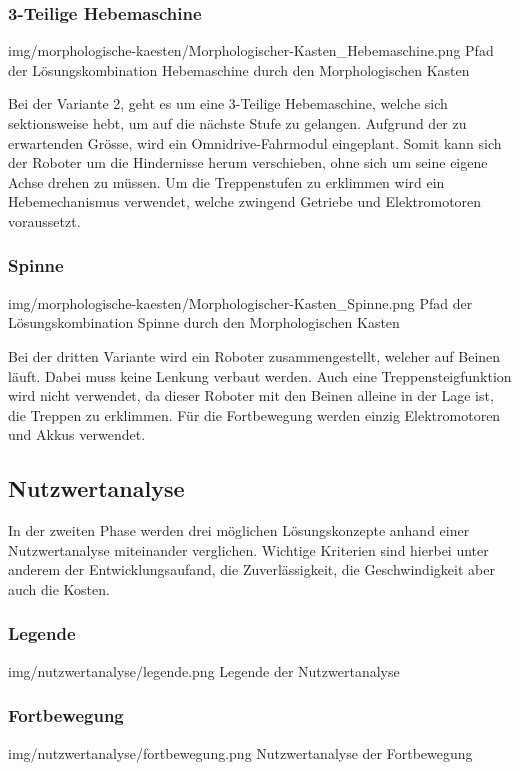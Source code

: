 \subsubsection{3-Teilige Hebemaschine}
\image
   {img/morphologische-kaesten/Morphologischer-Kasten_Hebemaschine.png}
   {Pfad der Lösungskombination Hebemaschine durch den Morphologischen Kasten}
   
Bei der Variante 2, geht es um eine 3-Teilige Hebemaschine, welche sich sektionsweise hebt, um auf die nächste Stufe zu gelangen. Aufgrund der zu erwartenden Grösse, wird ein Omnidrive-Fahrmodul eingeplant. Somit kann sich der Roboter um die Hindernisse herum verschieben, ohne sich um seine eigene Achse drehen zu müssen. Um die Treppenstufen zu erklimmen wird ein Hebemechanismus verwendet, welche zwingend Getriebe und Elektromotoren voraussetzt.

\subsubsection{Spinne}
\image
   {img/morphologische-kaesten/Morphologischer-Kasten_Spinne.png}
   {Pfad der Lösungskombination Spinne durch den Morphologischen Kasten}
   
Bei der dritten Variante wird ein Roboter zusammengestellt, welcher auf Beinen läuft. Dabei muss keine Lenkung verbaut werden. Auch eine Treppensteigfunktion wird nicht verwendet, da dieser Roboter mit den Beinen alleine in der Lage ist, die Treppen zu erklimmen. Für die Fortbewegung werden einzig Elektromotoren und Akkus verwendet.


\subsection{Nutzwertanalyse}
In der zweiten Phase werden drei möglichen Lösungskonzepte anhand einer Nutzwertanalyse miteinander verglichen. Wichtige Kriterien sind hierbei unter anderem der Entwicklungsaufand, die Zuverlässigkeit, die Geschwindigkeit aber auch die Kosten. 

\subsubsection{Legende}
\image
   {img/nutzwertanalyse/legende.png}
   {Legende der Nutzwertanalyse}

\subsubsection{Fortbewegung}
\image
   {img/nutzwertanalyse/fortbewegung.png}
   {Nutzwertanalyse der Fortbewegung}
   
